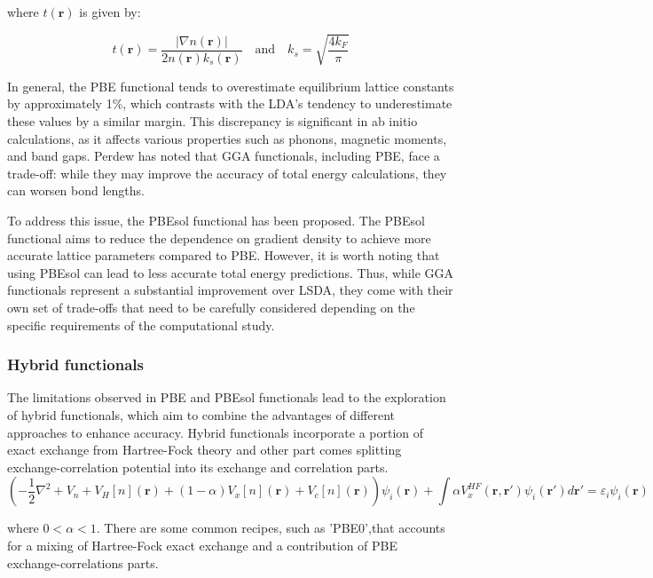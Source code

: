 where \(t(\mathbf{r})\) is given by:

\begin{equation}
	t(\mathbf{r}) = \dfrac{|\nabla n (\mathbf{r})|}{2 n (\mathbf{r}) k_{s}(\mathbf{r})} \quad \text{and} \quad k_s = \sqrt{\frac{4 k_F}{\pi}}
\end{equation}

In general, the PBE functional tends to overestimate equilibrium lattice constants by approximately 1\%, which contrasts with the LDA's tendency to underestimate these values by a similar margin. This discrepancy is significant in ab initio calculations, as it affects various properties such as phonons, magnetic moments, and band gaps. Perdew has noted that GGA functionals, including PBE, face a trade-off: while they may improve the accuracy of total energy calculations, they can worsen bond lengths. 

To address this issue, the PBEsol functional has been proposed. The PBEsol functional aims to reduce the dependence on gradient density to achieve more accurate lattice parameters compared to PBE. However, it is worth noting that using PBEsol can lead to less accurate total energy predictions. Thus, while GGA functionals represent a substantial improvement over LSDA, they come with their own set of trade-offs that need to be carefully considered depending on the specific requirements of the computational study.


\subsubsection{Hybrid functionals}

The limitations observed in PBE and PBEsol functionals lead to the exploration of hybrid functionals, which aim to combine the advantages of different approaches to enhance accuracy. Hybrid functionals incorporate a portion of exact exchange from Hartree-Fock theory and other part comes splitting exchange-correlation potential into its exchange and correlation parts.
\begin{equation}
	\left(-\dfrac{1}{2} \nabla^{2} +V_{n} +V_{H}[n](\mathbf{r})+(1- \alpha)V_{x}[n](\mathbf{r})+V_{c}[n](\mathbf{r})  \right)\psi_{i}(\mathbf{r}) + \int \alpha V_{x}^{HF}(\mathbf{r},\mathbf{r}') \psi_{i}(\mathbf{r}') d \mathbf{r}' = \varepsilon_{i} \psi_{i} (\mathbf{r})
\end{equation}

where $0<\alpha<1$. There are some common recipes, such as 'PBE0',that accounts for a mixing of Hartree-Fock exact exchange and a contribution of PBE exchange-correlations parts.

